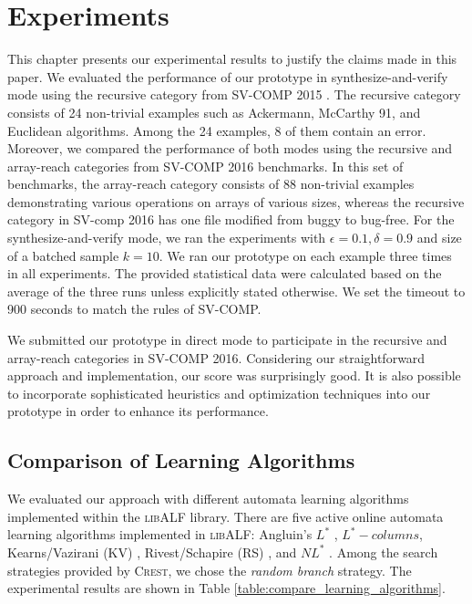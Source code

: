 \newcommand{\Mem}{\textit{Mem} }
\newcommand{\Equ}{\textit{Equ} }
\newcommand{\safe}{S}
\newcommand{\unsafe}{U}
\newcommand{\unknown}{?}
\newcommand{\exception}{E}
\newcommand{\timeout}{T.O.}
\newcommand{\unknownmark}{\ensuremath{^?}}
\newcommand{\wrongmark}{\ensuremath{^!}}

\chapter{Experiments}\label{ch:experiments}

This chapter presents our experimental results to justify the claims made in this paper. We evaluated the performance of our prototype in synthesize-and-verify mode using the recursive category from SV-COMP 2015 \cite{svcomp15} \cite{svcomp-benchmarks}. The recursive category consists of 24 non-trivial examples such as Ackermann, McCarthy 91, and Euclidean algorithms. Among the 24 examples, 8 of them contain an error. Moreover, we compared the performance of both modes using the recursive and array-reach categories from SV-COMP 2016 \cite{svcomp16} benchmarks. In this set of benchmarks, the array-reach category consists of 88 non-trivial examples demonstrating various operations on arrays of various sizes, whereas the recursive category in SV-comp 2016 has one file modified from buggy to bug-free. For the synthesize-and-verify mode, we ran the experiments with $\epsilon = 0.1, \delta = 0.9$ and size of a batched sample $k = 10$. We ran our prototype on each example three times in all experiments. The provided statistical data were calculated based on the average of the three runs unless explicitly stated otherwise. We set the timeout to 900 seconds to match the rules of SV-COMP.  

We submitted our prototype in direct mode to participate in the recursive and array-reach categories in SV-COMP 2016. Considering our straightforward approach and implementation, our score was surprisingly good. It is also possible to incorporate sophisticated heuristics and optimization techniques into our prototype in order to enhance its performance.

\section{Comparison of Learning Algorithms}\label{sec:compare_learning_algorithms}

We evaluated our approach with different automata learning algorithms implemented within the \textsc{libALF} library. There are five active online automata learning algorithms implemented in \textsc{libALF}: Angluin's $L^\ast$ \cite{Angluin87}, $L^\ast-columns$, Kearns/Vazirani (KV) \cite{KearnsV94}, Rivest/Schapire (RS) \cite{RivestS93}, and $NL^\ast$ \cite{BolligHKL09}. Among the search strategies provided by \textsc{Crest}, we chose the \emph{random branch} strategy. The experimental results are shown in Table \ref{table:compare_learning_algorithms}.

